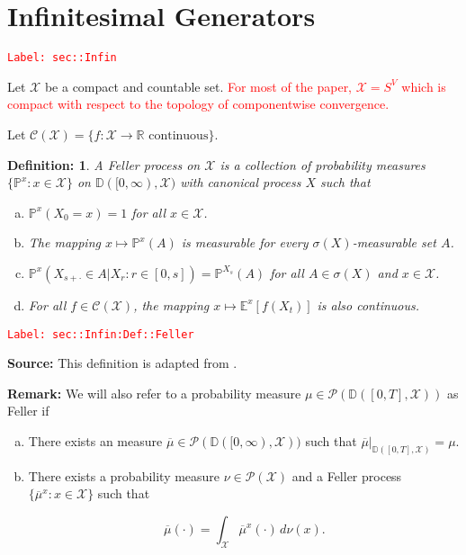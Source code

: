 \documentclass[12pt]{article}
\newcommand{\mb}{\mathbb}
\newcommand{\mc}{\mathcal}
\newcommand{\ra}{\rightarrow}
\newcommand{\ov}{\overline}
\newcommand{\te}{\text}
\newcommand{\tr}{\textcolor{red}}
\newcommand{\labe}[1]{\tr{\texttt{Label: #1}}}
\newcommand{\pr}{\mb{P}}							%
\newcommand{\cad}{\mb{D}}							%
\newtheorem{defn}[thms]{Definition: }
\begin{document}
\section{Infinitesimal Generators}
\label{sec::Infin}\labe{sec::Infin}

Let \(\mc{X}\) be a compact and countable set. \tr{For most of the paper, \(\mc{X} = S^V\) which is compact with respect to the topology of componentwise convergence.}

Let \(\mc{C}(\mc{X})= \{f:\mc{X} \ra \mb{R} \te{ continuous}\}\).

\begin{defn}
A Feller process on \(\mc{X}\) is a collection of probability measures \(\{\pr^x:x \in \mc{X}\}\) on \(\cad([0,\infty),\mc{X})\) with canonical process \(X\) such that

\begin{enumerate}[(a)]
\item \(\pr^x(X_0 = x) = 1\) for all \(x \in \mc{X}\).

\item The mapping \(x \mapsto \pr^x(A)\) is measurable for every \(\sigma(X)\)-measurable set \(A\).

\item \(\pr^x(X_{s+\cdot} \in A|X_r:r \in [0,s]) = \pr^{X_s}(A)\) for all \(A \in \sigma(X)\) and \(x \in \mc{X}\).

\item For all \(f\in \mc{C}(\mc{X})\), the mapping \(x\mapsto \mb{E}^x[f(X_t)]\) is also continuous.
\end{enumerate}
\label{sec::Infin:Def::Feller}
\end{defn}
\labe{sec::Infin:Def::Feller}

\textbf{Source: } This definition is adapted from \cite[Definition 1.1,1.2]{Lig85}.

\textbf{Remark: } We will also refer to a probability measure \(\mu \in \mc{P}(\cad([0,T],\mc{X}))\) as Feller if

\begin{enumerate}[(a)]
\item There exists an measure \(\ov{\mu}\in \mc{P}(\cad([0,\infty),\mc{X}))\) such that \(\ov{\mu}|_{\cad([0,T],\mc{X})} = \mu\).

\item There exists a probability measure \(\nu\in \mc{P}(\mc{X})\) and a Feller process \(\{\ov{\mu}^x:x \in \mc{X}\}\) such that 

\[\ov{\mu}(\cdot) = \int_{\mc{X}} \ov{\mu}^x(\cdot)\,d\nu(x).\]
\end{enumerate}
\end{document}
